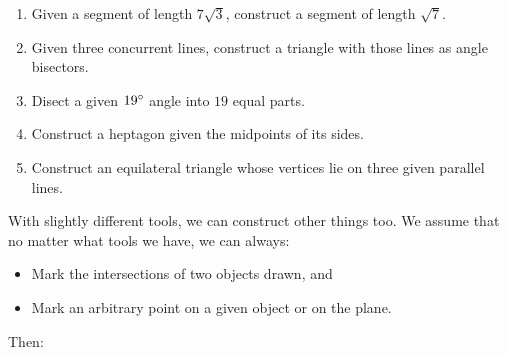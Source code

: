 \documentclass[11pt,paper=letter]{scrartcl}
\begin{document}
\begin{enumerate}[resume]

  \item Given a segment of length $7\sqrt3$, construct a segment of length $\sqrt7$. %


  \item Given three concurrent lines, construct a triangle with those lines as angle bisectors. %

  \item Disect a given $19^\circ$ angle into $19$ equal parts. %

  \item Construct a heptagon given the midpoints of its sides. %

  \item Construct an equilateral triangle whose vertices lie on three given parallel lines. %
\end{enumerate}

\noindent With slightly different tools, we can construct other things too. We assume that no matter what tools we have, we can always:
\begin{itemize}
  \item Mark the intersections of two objects drawn, and
  \item Mark an arbitrary point on a given object or on the plane.
\end{itemize}

\noindent Then:
\end{document}
